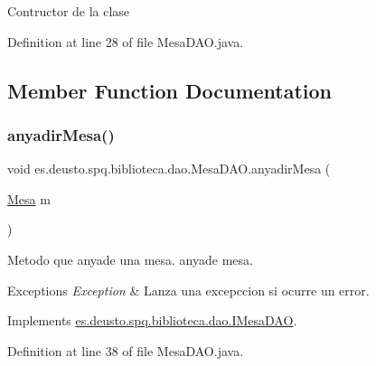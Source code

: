 Contructor de la clase 

Definition at line 28 of file Mesa\+D\+A\+O.\+java.



\subsection{Member Function Documentation}
\mbox{\label{classes_1_1deusto_1_1spq_1_1biblioteca_1_1dao_1_1_mesa_d_a_o_aea7e6b72ca52e203015e78fa9f7d3817}} 
\subsubsection{\texorpdfstring{anyadir\+Mesa()}{anyadirMesa()}}
{\footnotesize\ttfamily void es.\+deusto.\+spq.\+biblioteca.\+dao.\+Mesa\+D\+A\+O.\+anyadir\+Mesa (\begin{DoxyParamCaption}\item[{\mbox{\hyperlink{classes_1_1deusto_1_1spq_1_1biblioteca_1_1data_1_1_mesa}{Mesa}}}]{m }\end{DoxyParamCaption})}

Metodo que anyade una mesa.  anyade mesa. 
\begin{DoxyExceptions}{Exceptions}
{\em Exception} & Lanza una excepccion si ocurre un error. \\
\hline
\end{DoxyExceptions}


Implements \mbox{\hyperlink{interfacees_1_1deusto_1_1spq_1_1biblioteca_1_1dao_1_1_i_mesa_d_a_o_ac50be7c69b793e067aceb17f3b01594a}{es.\+deusto.\+spq.\+biblioteca.\+dao.\+I\+Mesa\+D\+AO}}.



Definition at line 38 of file Mesa\+D\+A\+O.\+java.

